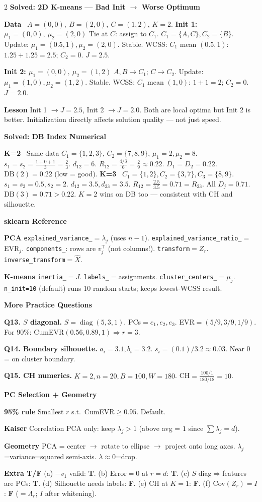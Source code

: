 \documentclass[10pt,fleqn]{article}
\newcommand{\shead}[1]{\vspace{0.1ex}\textbf{\scriptsize #1}\par}
\newcommand{\topic}[1]{\textbf{#1}\ }
\newcommand{\qa}[2]{\textbf{#1} #2\par}
\begin{document}
\begin{multicols*}{2}
\shead{Solved: 2D K-means — Bad Init \(\to\) Worse Optimum}
\topic{Data} \(A=(0,0),\ B=(2,0),\ C=(1,2)\), \(K=2\).
\qa{Init 1: \(\mu_1=(0,0),\ \mu_2=(2,0)\)}{Tie at \(C\): assign to \(C_1\). \(C_1=\{A,C\},C_2=\{B\}\). Update: \(\mu_1=(0.5,1),\mu_2=(2,0)\). Stable. WCSS: \(C_1\) mean \((0.5,1)\): \(1.25+1.25=2.5\); \(C_2=0\). \(\boxed{J=2.5}\).}
\qa{Init 2: \(\mu_1=(0,0),\ \mu_2=(1,2)\)}{\(A,B\to C_1\); \(C\to C_2\). Update: \(\mu_1=(1,0),\mu_2=(1,2)\). Stable. WCSS: \(C_1\) mean \((1,0)\): \(1+1=2\); \(C_2=0\). \(\boxed{J=2.0}\).}
\qa{Lesson}{Init 1 \(\to J=2.5\), Init 2 \(\to J=2.0\). Both are local optima but Init 2 is better. Initialization directly affects solution quality — not just speed.}

\shead{Solved: DB Index Numerical}
\topic{K=2} Same data \(C_1=\{1,2,3\}\), \(C_2=\{7,8,9\}\), \(\mu_1=2,\mu_2=8\). \(s_1=s_2=\tfrac{1+0+1}{3}=\tfrac23\). \(d_{12}=6\). \(R_{12}=\tfrac{4/3}{6}=\tfrac29\approx0.22\). \(D_1=D_2=0.22\). \(\mathrm{DB}(2)=\boxed{0.22}\) (low = good).
\topic{K=3} \(C_1=\{1,2\},C_2=\{3,7\},C_3=\{8,9\}\). \(s_1=s_3=0.5,s_2=2\). \(d_{12}=3.5,d_{23}=3.5\). \(R_{12}=\tfrac{2.5}{3.5}=0.71=R_{23}\). All \(D_j=0.71\). \(\mathrm{DB}(3)=0.71>0.22\). \(\boxed{K=2}\) wins on DB too — consistent with CH and silhouette.

\shead{sklearn Reference}
\qa{PCA}{\texttt{explained\_variance\_}\(=\lambda_j\) (uses \(n{-}1\)). \texttt{explained\_variance\_ratio\_}\(=\)EVR\(_j\). \texttt{components\_}: rows are \(v_j^\top\) (not columns!). \texttt{transform}\(=Z_r\). \texttt{inverse\_transform}\(=\hat X\).}
\qa{K-means}{\texttt{inertia\_}\(=J\). \texttt{labels\_}\(=\)assignments. \texttt{cluster\_centers\_}\(=\mu_j\). \texttt{n\_init=10} (default) runs 10 random starts; keeps lowest-WCSS result.}

\shead{More Practice Questions}
\qa{Q13. \(S\) diagonal.}{\(S=\operatorname{diag}(5,3,1)\). PCs\(=e_1,e_2,e_3\). EVR\(=(5/9,3/9,1/9)\). For 90\%: CumEVR\((0.56,0.89,1)\Rightarrow r=3\).}
\qa{Q14. Boundary silhouette.}{\(a_i=3.1,b_i=3.2\). \(s_i=(0.1)/3.2\approx0.03\). Near 0 = on cluster boundary.}
\qa{Q15. CH numerics.}{\(K=2,n=20,B=100,W=180\). CH\(=\tfrac{100/1}{180/18}=10\).}

\shead{PC Selection + Geometry}
\qa{95\% rule}{Smallest \(r\) s.t.\ CumEVR\(\ge0.95\). Default.}
\qa{Kaiser}{Correlation PCA only: keep \(\lambda_j>1\) (above avg = \(1\) since \(\sum\lambda_j=d\)).}
\qa{Geometry}{PCA = center \(\to\) rotate to ellipse \(\to\) project onto long axes. \(\lambda_j\)=variance=squared semi-axis. \(\lambda\approx0\)=drop.}
\qa{Extra T/F}{(a) \(-v_1\) valid: \textbf{T}. (b) Error\(=0\) at \(r=d\): \textbf{T}. (c) \(S\) diag\(\Rightarrow\)features are PCs: \textbf{T}. (d) Silhouette needs labels: \textbf{F}. (e) CH at \(K=1\): \textbf{F}. (f) Cov\((Z_r)=I\): \textbf{F} (\(=\Lambda_r\); \(I\) after whitening).}



\end{multicols*}
\end{document}
